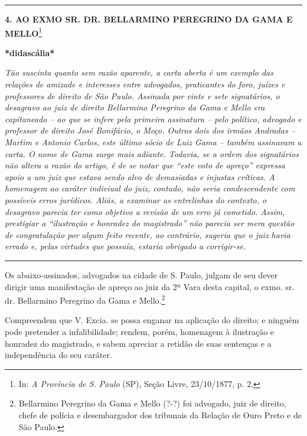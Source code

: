 \begin{center}\rule{0.5\linewidth}{\linethickness}\end{center}

\textbf{4. AO EXMO SR. DR. BELLARMINO PEREGRINO DA GAMA E
MELLO}\footnote{In: \emph{A Província de S. Paulo} (SP), Seção Livre,
  23/10/1877, p. 2.}

\textbf{*didascália*}

\emph{Tão suscinta quanto sem razão aparente, a carta aberta é um
exemplo das relações de amizade e interesses entre advogados,
praticantes do foro, juízes e professores de direito de São Paulo.
Assinada por vinte e sete signatários, o desagravo ao juiz de direito
Bellarmino Peregrino da Gama e Mello era capitaneado -- ao que se infere
pela primeira assinatura -- pelo político, advogado e professor de
direito José Bonifácio, o Moço. Outros dois dos irmãos Andradas --
Martim e Antonio Carlos, este último sócio de Luiz Gama -- também
assinavam a carta. O nome de Gama surge mais adiante. Todavia, se a
ordem dos signatários não altera a razão do artigo, é de se notar que
``este voto de apreço'' expressa apoio a um juiz que estava sendo alvo
de demasiadas e injustas críticas. A homenagem ao caráter indiviual do
juiz, contudo, não seria condescendente com possíveis erros jurídicos.
Aliás, a examinar as entrelinhas do contexto, o desagravo parecia ter
como objetivo a revisão de um erro já cometido. Assim, prestigiar a
``ilustração e honradez do magistrado'' não parecia ser mera questão de
congratulação por algum feito recente, ao contrário, sugeria que o juiz
havia errado e, pelas virtudes que possuía, estaria obrigado a
corrigir-se. }

\begin{center}\rule{0.5\linewidth}{\linethickness}\end{center}

Os abaixo-assinados, advogados na cidade de S. Paulo, julgam de seu
dever dirigir uma manifestação de apreço ao juiz da 2ª Vara desta
capital, o exmo. sr. dr. Bellarmino Peregrino da Gama e Mello.\footnote{Bellarmino
  Peregrino da Gama e Mello (?-?) foi advogado, juiz de direito, chefe
  de polícia e desembargador dos tribunais da Relação de Ouro Preto e de
  São Paulo.}

Compreendem que V. Excia. se possa enganar na aplicação do direito; e
ninguém pode pretender a infalibilidade; rendem, porém, homenagem à
ilustração e honradez do magistrado, e sabem apreciar a retidão de suas
sentenças e a independência do seu caráter.

